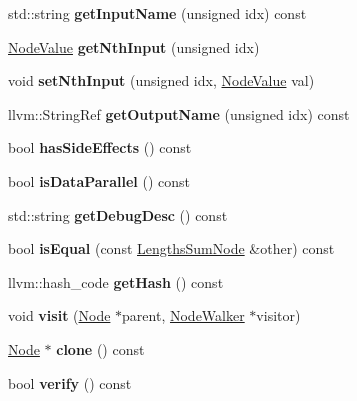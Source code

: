 \begin{DoxyCompactItemize}
std\+::string {\bfseries get\+Input\+Name} (unsigned idx) const
\item 
\mbox{\label{classglow_1_1_lengths_sum_node_ad7a24c850d8a58145b652785ddc21f8b}} 
\hyperlink{structglow_1_1_node_value}{Node\+Value} {\bfseries get\+Nth\+Input} (unsigned idx)
\item 
\mbox{\label{classglow_1_1_lengths_sum_node_a186b41829602ab2e297a1ca729467ea3}} 
void {\bfseries set\+Nth\+Input} (unsigned idx, \hyperlink{structglow_1_1_node_value}{Node\+Value} val)
\item 
\mbox{\label{classglow_1_1_lengths_sum_node_a1f53109e9b5da7535c4518a780e0413f}} 
llvm\+::\+String\+Ref {\bfseries get\+Output\+Name} (unsigned idx) const
\item 
\mbox{\label{classglow_1_1_lengths_sum_node_a2f10cc3e81aa682bc59cb4d8c8443ad0}} 
bool {\bfseries has\+Side\+Effects} () const
\item 
\mbox{\label{classglow_1_1_lengths_sum_node_a61f9632ae241dd81799b49ac3812008b}} 
bool {\bfseries is\+Data\+Parallel} () const
\item 
\mbox{\label{classglow_1_1_lengths_sum_node_a8a78724926b0900a59c2283c736ab937}} 
std\+::string {\bfseries get\+Debug\+Desc} () const
\item 
\mbox{\label{classglow_1_1_lengths_sum_node_aebae6bc94f1da6f5faea430eea6333b1}} 
bool {\bfseries is\+Equal} (const \hyperlink{classglow_1_1_lengths_sum_node}{Lengths\+Sum\+Node} \&other) const
\item 
\mbox{\label{classglow_1_1_lengths_sum_node_abc0ff190ff3e68cc47c7e2136c5f22e7}} 
llvm\+::hash\+\_\+code {\bfseries get\+Hash} () const
\item 
\mbox{\label{classglow_1_1_lengths_sum_node_ab8985c9227fa777e43ca4d616e03e6b6}} 
void {\bfseries visit} (\hyperlink{classglow_1_1_node}{Node} $\ast$parent, \hyperlink{classglow_1_1_node_walker}{Node\+Walker} $\ast$visitor)
\item 
\mbox{\label{classglow_1_1_lengths_sum_node_abd47edfc05aeef9b7306c7c9f57a650d}} 
\hyperlink{classglow_1_1_node}{Node} $\ast$ {\bfseries clone} () const
\item 
\mbox{\label{classglow_1_1_lengths_sum_node_ab916f9a01782514ab907c4471cd716d8}} 
bool {\bfseries verify} () const
\end{DoxyCompactItemize}
